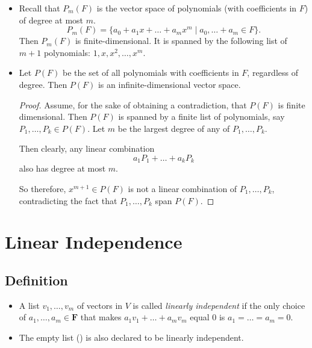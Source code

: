 \documentclass[11pt]{article}
\begin{document}
    \begin{itemize}
        \item Recall that \(P_m(F)\) is the vector space of polynomials (with coefficients in $F$) of degree at most $m$. \[P_m(F) = \{a_0 + a_1 x + \dots + a_m x^m \mid a_0, \dots + a_m \in F\}.\] Then \(P_m(F)\) is finite-dimensional. It is spanned by the following list of $m+1$ polynomials: \(1, x, x^2, \dots, x^m.\)
        \item Let \(P(F)\) be the set of all polynomials with coefficients in $F$, regardless of degree. Then \(P(F)\) is an infinite-dimensional vector space.
        \begin{proof}
            Assume, for the sake of obtaining a contradiction, that \(P(F)\) is finite dimensional. Then \(P(F)\) is spanned by a finite list of polynomials, say \(P_1, \dots , P_k \in P(F)\). Let $m$ be the largest degree of any of \(P_1, \dots, P_k.\) 

            Then clearly, any linear combination \[a_1 P_1 + \dots + a_k P_k\] also has degree at most $m$. 

            So therefore, \(x^{m+1} \in P(F)\) is not a linear combination of \(P_1, \dots, P_k\), contradicting the fact that \(P_1, \dots, P_k\) span \(P(F)\).
        \end{proof}
    \end{itemize}
    
    \section{Linear Independence}

    \subsection{Definition}
    \begin{itemize}
        \item A list \(v_1, \dots, v_m\) of vectors in $V$ is called \emph{linearly independent} if the only choice of \(a_1, \dots, a_m \in \textbf{F}\) that makes \(a_1 v_1 + \dots + a_m v_m\) equal 0 is \(a_1 = \dots = a_m = 0.\)
        \item The empty list () is also declared to be linearly independent.
    \end{itemize}
\end{document}
